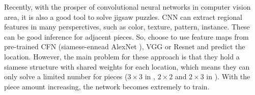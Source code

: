 \documentclass{article}
\begin{document}
Recently, with the prosper of convolutional neural networks in computer vision area, it is also a good tool to solve jigsaw puzzles. CNN can extract regional features in many persperctives, such as color, texture, pattern, instance. These can be good inference for adjacent pieces. So, \cite{deryneural,noroozi2016unsupervised} choose to use feature maps from pre-trained CFN \cite{noroozi2016unsupervised} (siamese-ennead AlexNet \cite{krizhevsky2012imagenet}), VGG \cite{he2016deep} or Resnet \cite{simonyan2014very} and predict the location. However, the main problem for these approach is that they hold a siamese structure with shared weights for each location, which means they can only solve a limited number for pieces ($3\times3$ in \cite{noroozi2016unsupervised}, $2\times2$ and $2\times3$ in \cite{deryneural}). With the piece amount increasing, the network becomes extremely to train.



\end{document}
